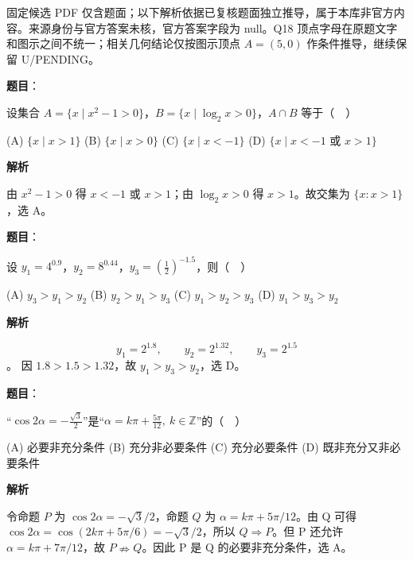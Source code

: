 

\begin{gktip}
固定候选 PDF 仅含题面；以下解析依据已复核题面独立推导，属于本库非官方内容。来源身份与官方答案未核，官方答案字段为 null。Q18 顶点字母在原题文字和图示之间不统一；相关几何结论仅按图示顶点 \(A=(5,0)\) 作条件推导，继续保留 U/PENDING。
\end{gktip}


\begin{answer}

\textbf{题目}：

设集合 \(A=\{x\mid x^2-1>0\}\)，\(B=\{x\mid \log_2x>0\}\)，\(A\cap B\) 等于（　）

    (A) \(\{x\mid x>1\}\)
    (B) \(\{x\mid x>0\}\)
    (C) \(\{x\mid x<-1\}\)
    (D) \(\{x\mid x<-1\text{ 或 }x>1\}\)

\textbf{解析}

由 \(x^2-1>0\) 得 \(x<-1\) 或 \(x>1\)；由 \(\log_2x>0\) 得 \(x>1\)。故交集为 \(\{x:x>1\}\)，选 A。


\end{answer}
\begin{answer}

\textbf{题目}：

设 \(y_1=4^{0.9}\)，\(y_2=8^{0.44}\)，\(y_3=\left(\frac12\right)^{-1.5}\)，则（　）

    (A) \(y_3>y_1>y_2\)
    (B) \(y_2>y_1>y_3\)
    (C) \(y_1>y_2>y_3\)
    (D) \(y_1>y_3>y_2\)

\textbf{解析}

\nopagebreak[4]
\[
y_1=2^{1.8},\qquad y_2=2^{1.32},\qquad y_3=2^{1.5}
\]
。
因 \(1.8>1.5>1.32\)，故 \(y_1>y_3>y_2\)，选 D。


\end{answer}
\begin{answer}

\textbf{题目}：

“\(\cos 2\alpha=-\frac{\sqrt3}{2}\)”是“\(\alpha=k\pi+\frac{5\pi}{12},\ k\in\mathbb Z\)”的（　）

    (A) 必要非充分条件
    (B) 充分非必要条件
    (C) 充分必要条件
    (D) 既非充分又非必要条件

\textbf{解析}

令命题 \(P\) 为 \(\cos2\alpha=-\sqrt3/2\)，命题 \(Q\) 为 \(\alpha=k\pi+5\pi/12\)。由 Q 可得 \(\cos2\alpha=\cos(2k\pi+5\pi/6)=-\sqrt3/2\)，所以 \(Q\Rightarrow P\)。但 P 还允许 \(\alpha=k\pi+7\pi/12\)，故 \(P\nRightarrow Q\)。因此 P 是 Q 的必要非充分条件，选 A。


\end{answer}
